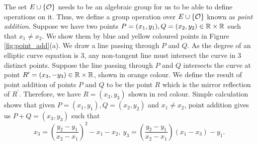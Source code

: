 The set $E \cup \{\mathcal{O}\}$ needs to be an algebraic group for us to be able to define operations on it.
Thus, we define a group operation over $E \cup \{\mathcal{O}\}$ known as \textit{point addition}.
Suppose we have two points $P = (x_1, y_1), Q = (x_2,y_2) \in \mathbb{R} \times \mathbb{R}$ such that $x_1 \neq x_2$. 
We show them by blue and yellow coloured points in Figure \ref{fig:point_add}(a).
We draw a line passing through $P$ and $Q$. 
As the degree of an elliptic curve equation is 3, any non-tangent line must intersect the curve in 3 distinct points.
Suppose the line passing through $P$ and $Q$ intersects the curve at point $R^{\prime} = (x_3, -y_3) \in \mathbb{R} \times \mathbb{R}$, shown in orange colour.
We define the result of point addition of points $P$ and $Q$ to be the point $R$ which is the mirror reflection of $R^{\prime}$.
Therefore, we have $R = (x_3, y_3)$ shown in red colour. 
Simple calculation shows that given $P = (x_1,y_1), Q = (x_2, y_2)$ and $x_1 \neq x_2$, point addition gives us $P+Q = (x_3, y_3)$ such that
\begin{equation}
    x_3 = \left( \frac{y_2-y_1}{x_2-x_1} \right)^2 -x_1 -x_2, \ y_3 = \left( \frac{y_2-y_1}{x_2-x_1} \right) (x_1 - x_3) - y_1.
    \label{eqn:point_add}
\end{equation}

